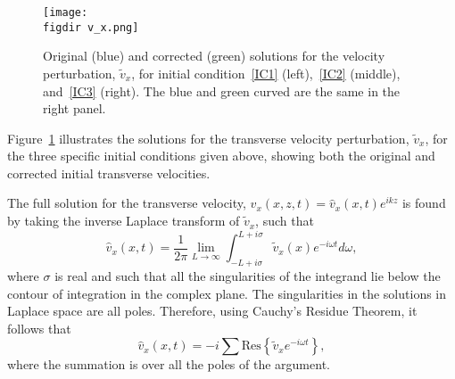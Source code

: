 \documentclass[12pt]{../style-files/ociamthesis}
\begin{document}
%
\begin{figure}
	\texttt{[image: \\figdir v\_x.png]}
	\caption{Original \cite{rae_etal81} (blue) and corrected (green) solutions for the velocity perturbation, $\tilde{v}_x$, for initial condition~\ref{IC1} (left),~\ref{IC2} (middle), and~\ref{IC3} (right). The blue and green curved are the same in the right panel.}
	\label{fig: vx}
\end{figure}
Figure~\ref{fig: vx} illustrates the solutions for the transverse velocity perturbation, $\tilde{v}_x$, for the three specific initial conditions given above, showing both the original and corrected initial transverse velocities.

The full solution for the transverse velocity, $v_x(x, z, t) = \hat{v}_x(x,t)e^{ikz}$ is found by taking the inverse Laplace transform of $\tilde{v}_x$, such that
\begin{equation}
\hat{v}_x(x,t) = \frac{1}{2\pi} \lim_{L \to \infty} \int_{-L + i\sigma}^{L + i\sigma} \tilde{v}_x(x)e^{-i\omega t} d\omega,
\end{equation}
where $\sigma$ is real and such that all the singularities of the integrand lie below the contour of integration in the complex plane. The singularities in the solutions in Laplace space are all poles. Therefore, using Cauchy's Residue Theorem, it follows that
\begin{equation}
\hat{v}_x(x, t) = -i\sum \mathrm{Res}\left\{\tilde{v}_xe^{-i\omega t}\right\},
\end{equation}
where the summation is over all the poles of the argument.
\end{document}
